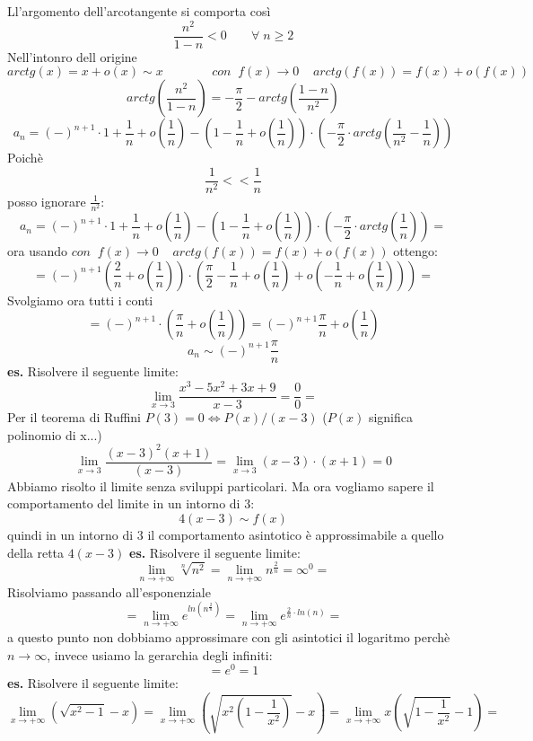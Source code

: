 Ll'argomento dell'arcotangente si comporta così
\[
    \frac{n^2}{1-n}<0 \;\;\;\;\;\;\;\forall\;n\geq 2
\]
Nell'intonro dell origine
\[
    arctg(x) = x +o(x) \sim x \;\;\;\;\;\;\;\;\;\;\;\;\;\;con \;\;f(x)\rightarrow 0 \;\;\;\;arctg(f(x)) = f(x) + o(f(x))
\]
\[
    arctg(\frac{n^2}{1-n}) = -\frac{\pi}{2}-arctg(\frac{1-n}{n^2})
\]
\[
    a_n = (-)^{n+1} \cdot 1+\frac{1}{n}+o(\frac{1}{n}) -(1-\frac{1}{n} +o(\frac{1}{n})) \cdot (-\frac{\pi}{2} \cdot  arctg(\frac{1}{n^2} - \frac{1}{n}))
\]
Poichè
\[
    \frac{1}{n^2} << \frac{1}{n}
\]
posso ignorare $\frac{1}{n^2}$:
\[
    a_n = (-)^{n+1} \cdot 1+\frac{1}{n}+o(\frac{1}{n}) -(1-\frac{1}{n} +o(\frac{1}{n})) \cdot (-\frac{\pi}{2} \cdot  arctg(\frac{1}{n})) = 
\]
ora usando $con \;\;f(x)\rightarrow 0 \;\;\;\;arctg(f(x)) = f(x) + o(f(x))$ ottengo:
\[
    = (-)^{n+1} (\frac{2}{n} + o (\frac{1}{n})) \cdot (\frac{\pi}{2} - \frac{1}{n} + o(\frac{1}{n}) + o( - \frac{1}{n} + o(\frac{1}{n})))=
\]
Svolgiamo ora tutti i conti
\[
    = (-)^{n+1} \cdot (\frac{\pi}{n} + o(\frac{1}{n})) =  (-)^{n+1}\frac{\pi}{n} + o(\frac{1}{n})
\]
\[
    a_n \sim (-)^{n+1}\frac{\pi}{n} 
\]
\newline
\newline
\textbf{es.} Risolvere il seguente limite:
\[
    \lim_{x\rightarrow 3} \frac{x^3 -5 x^2 +3x + 9}{x-3} = \frac{0}{0}=
\]
Per il teorema di Ruffini $P(3) = 0 \Longleftrightarrow P(x)/(x-3)$ ($P(x)$ significa polinomio di x...)
\[
    \lim_{x\rightarrow 3} \frac{(x-3)^2(x+1)}{(x-3)} = \lim_{x\rightarrow 3} (x-3) \cdot (x+1) = 0
\]
Abbiamo risolto il limite senza sviluppi particolari. Ma ora vogliamo sapere il comportamento del limite in un intorno di $3$:
\[
    4(x-3) \sim  f(x)
\]
quindi in un intorno di $3$ il comportamento asintotico è approssimabile a quello della retta $4(x-3)$
\newline
\newline
\newline
\textbf{es.} Risolvere il seguente limite:
\[
    \lim_{n\rightarrow + \infty} \sqrt[n]{n^2} = \lim_{n\rightarrow +\infty} n^{\frac{2}{n}} = \infty^0 =  
\]
Risolviamo passando all'esponenziale
\[
    = \lim_{n\rightarrow + \infty} e^{ln(n^{\frac{2}{n}})} = \lim_{n\rightarrow +\infty} e ^{\frac{2}{n} \cdot  ln(n)} = 
\]
a questo punto non dobbiamo approssimare con gli asintotici il logaritmo perchè $n \rightarrow  \infty$, invece usiamo la gerarchia degli infiniti:
\[
    = e^0 = 1
\]
\newline
\newline
\textbf{es.} Risolvere il seguente limite:
\[
    \lim_{x\rightarrow + \infty} (\sqrt{x^2-1}-x) = \lim_{x\rightarrow + \infty} (\sqrt{x^2(1- \frac{1}{x^2})}-x) = \lim_{x\rightarrow +\infty} x(\sqrt{1-\frac{1}{x^2}}-1) = 
\]
